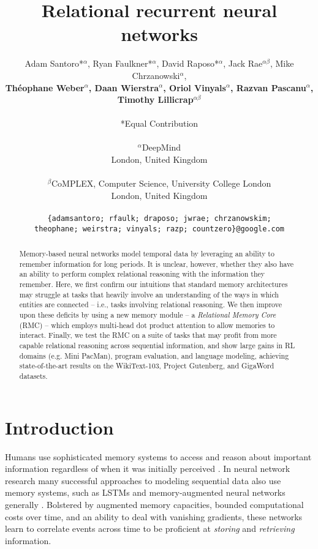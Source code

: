 \documentclass{article}
\title{Relational recurrent neural networks}
\author{
Adam Santoro*$^{\alpha}$, Ryan Faulkner*$^{\alpha}$, David Raposo*$^{\alpha}$, Jack Rae$^{\alpha \beta}$, Mike Chrzanowski$^{\alpha}$,\\
\textbf{Th\'eophane Weber$^{\alpha}$, Daan Wierstra$^{\alpha}$, Oriol Vinyals$^{\alpha}$, Razvan Pascanu$^{\alpha}$, Timothy Lillicrap$^{\alpha \beta}$}\\
\\
*Equal Contribution\\
\\
$^{\alpha}$DeepMind\\
London, United Kingdom\\
\\
$^{\beta}$CoMPLEX, Computer Science, University College London\\
London, United Kingdom\\
\\
\small\texttt{\{adamsantoro; rfaulk; draposo; jwrae; chrzanowskim;}\\
\small\texttt{theophane; weirstra; vinyals; razp; countzero\}@google.com}
}
\begin{document}
\maketitle

\begin{abstract}
Memory-based neural networks model temporal data by leveraging an ability to remember information for long periods. It is unclear, however, whether they also have an ability to perform complex relational reasoning with the information they remember. Here, we first confirm our intuitions that standard memory architectures may struggle at tasks that heavily involve an understanding of the ways in which entities are connected -- i.e., tasks involving relational reasoning. We then improve upon these deficits by using a new memory module -- a \textit{Relational Memory Core} (RMC) -- which employs multi-head dot product attention to allow memories to interact. Finally, we test the RMC on a suite of tasks that may profit from more capable relational reasoning across sequential information, and show large gains in RL domains (e.g. Mini PacMan), program evaluation, and language modeling, achieving state-of-the-art results on the WikiText-103, Project Gutenberg, and GigaWord datasets.
\end{abstract}

\section{Introduction}

Humans use sophisticated memory systems to access and reason about important information regardless of when it was initially perceived \citep{schacter1994memory, knowlton2012neurocomputational}. In neural network research many successful approaches to modeling sequential data also use memory systems, such as LSTMs \citep{hochreiter1998lstm} and memory-augmented neural networks generally \citep{graves2014neural,graves2016hybrid,santoro2016meta,sukhbaatar2015end}. Bolstered by augmented memory capacities, bounded computational costs over time, and an ability to deal with vanishing gradients, these networks learn to correlate events across time to be proficient at \textit{storing} and \textit{retrieving} information.
\end{document}
